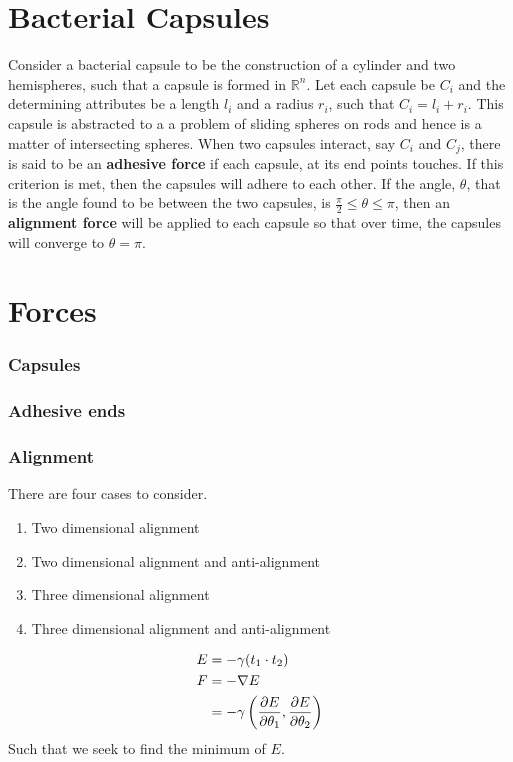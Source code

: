 \documentclass[journal, a4paper]{IEEEtran}
\begin{document}
\section{Bacterial Capsules}
	Consider a bacterial capsule to be the construction of a cylinder and two hemispheres, such that a capsule is formed in $\mathbb{R}^n$. Let each capsule be $C_i$ and the determining attributes be a length $l_i$ and a radius $r_i$, such that $C_i = l_i+r_i$. This capsule is abstracted to a a problem of sliding spheres on rods and hence is a matter of intersecting spheres. When two capsules interact, say $C_i$ and $C_j$, there is said to be an \textbf{adhesive force} if each capsule, at its end points touches. If this criterion is met, then the capsules will adhere to each other. If the angle, $\theta$, that is the angle found to be between the two capsules, is $\frac{\pi}{2} \leq \theta \leq \pi $, then an \textbf{alignment force} will be applied to each capsule so that over time, the capsules will converge to $\theta = \pi$.
\section{Forces}

\subsubsection{Capsules}
\subsubsection{Adhesive ends}
\subsubsection{Alignment}
There are four cases to consider.
\begin{enumerate}
    \item Two dimensional alignment
    \item Two dimensional alignment and anti-alignment
    \item Three dimensional alignment
    \item Three dimensional alignment and anti-alignment
\end{enumerate}
\begin{align}
    E   & = -\gamma (t_1\cdot t_2) \\
    F   & = -\nabla E \\
        & = -\gamma \left(\pdv{E}{\theta_1},\pdv{E}{\theta_2}\right)
\end{align}
Such that we seek to find the minimum of $E$.
\end{document}
